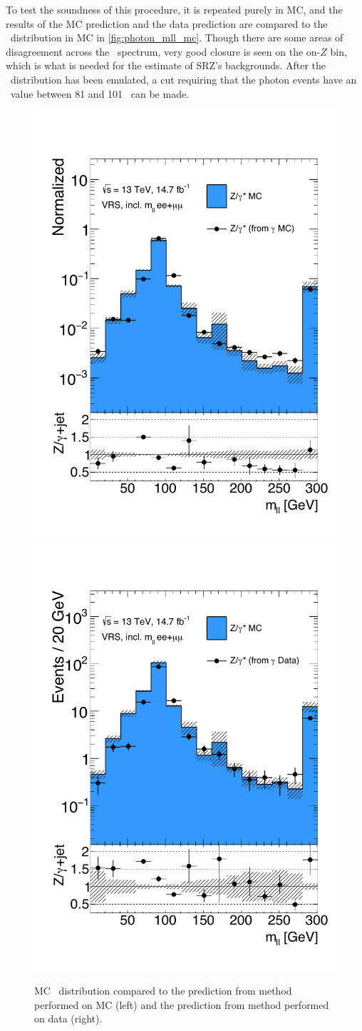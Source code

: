 To test the soundness of this procedure, it is repeated purely in \ac{MC}, and the results of the \ac{MC} prediction and the data prediction are compared to the \mll~distribution in \dyjets \ac{MC} in \autoref{fig:photon_mll_mc}. Though there are some areas of disagreement across the \mll~spectrum, very good closure is seen on the on-$Z$ bin, which is what is needed for the estimate of SRZ's backgrounds. After the \mll~distribution has been emulated, a cut requiring that the photon events have an \mll~value between 81 and 101 \gev~can be made.

\begin{centering}
\begin{figure}[!hbt]
\myfloatalign
\includegraphics[width=.45\linewidth]{figures/photons/DataMC_GJ_ee+mm_zmet_GMC.pdf}
\includegraphics[width=.45\linewidth]{figures/photons/DataMC_GJ_ee+mm_zmet_ZMC.pdf}
\caption{\dyjets \ac{MC} \mll~distribution compared to the prediction from \gjets method performed on \ac{MC} (left) and the prediction from \gjets method performed on data (right). }
\label{fig:photon_mll_mc}
\end{figure}
\end{centering}

